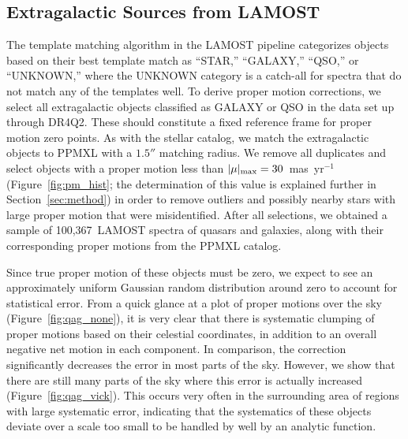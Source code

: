 \documentclass[11pt,preprint]{aastex6}
\begin{document}
\subsection{Extragalactic Sources from LAMOST} \label{sec:qso_selection}

The template matching algorithm in the LAMOST pipeline categorizes objects based on their best template match as ``STAR,'' ``GALAXY,'' ``QSO,'' or ``UNKNOWN,'' where the UNKNOWN category is a catch-all for spectra that do not match any of the templates well. To derive proper motion corrections, we select all extragalactic objects classified as GALAXY or QSO in the data set up through DR4Q2. These should constitute a fixed reference frame for proper motion zero points. As with the stellar catalog, we match the extragalactic objects to PPMXL with a $1.5''$ matching radius.
We remove all duplicates and select objects with a proper motion less than $|\mu|_{\rm max} = 30$~mas~yr$^{-1}$ (Figure~\ref{fig:pm_hist}; the determination of this value is explained further in Section~\ref{sec:method}) in order to remove outliers and possibly nearby stars with large proper motion that were misidentified.
After all selections, we obtained a sample of 100,367~LAMOST spectra of quasars and galaxies, along with their corresponding proper motions from the PPMXL catalog.


Since true proper motion of these objects must be zero, we expect to see an approximately uniform Gaussian random distribution around zero to account for statistical error.
From a quick glance at a plot of proper motions over the sky (Figure~\ref{fig:qag_none}), it is very clear that there is systematic clumping of proper motions based on their celestial coordinates, in addition to an overall negative net motion in each component.
In comparison, the \citet{Vickers2016} correction significantly decreases the error in most parts of the sky.
However, we show that there are still many parts of the sky where this error is actually increased (Figure~\ref{fig:qag_vick}).
This occurs very often in the surrounding area of regions with large systematic error, indicating that the systematics of these objects deviate over a scale too small to be handled by well by an analytic function.


\end{document}
